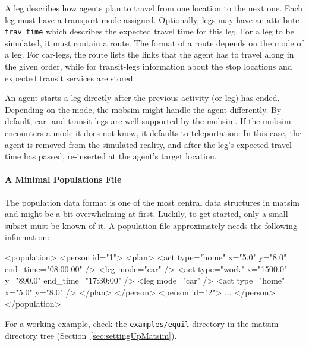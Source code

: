 A \gls{leg} describes how agents plan to travel from one location to the next one. Each \gls{leg} must have a transport mode assigned. Optionally, legs may have an attribute \lstinline|trav_time| which describes the expected travel time for this leg. For a leg to be simulated, it must contain a route. The format of a route depends on the mode of a leg. For car-legs, the route lists the links that the agent has to travel along in the given order, while for transit-legs information about the stop locations and expected transit services are stored.

An agent starts a leg directly after the previous activity (or leg) has ended. Depending on the mode, the \gls{mobsim} might handle the agent differently. By default, car- and transit-legs are well-supported by the \gls{mobsim}. If the \gls{mobsim} encounters a mode it does not know, it defaults to \gls{teleportation}: In this case, the agent is removed from the simulated reality, and after the leg's expected travel time has passed, re-inserted at the agent's target location.

\paragraph{A Minimal Populations File}

The population data format is one of the most central data structures in \gls{matsim} and might be a bit overwhelming at first. Luckily, to get started, only a small subset must be known of it.  A population file approximately needs the following information:
\begin{xml}
<population> 
   <person id="1"> 
      <plan> 
         <act type="home" x="5.0" y="8.0" end_time="08:00:00" /> 
         <leg mode="car" /> 
         <act type="work" x="1500.0" y="890.0" end_time="17:30:00" /> 
         <leg mode="car" /> 
         <act type="home" x="5.0" y="8.0" /> 
      </plan> 
   </person> 
   <person id="2"> 
      ... 
   </person> 
</population>
\end{xml}
For a working example, check the \lstinline{examples/equil} directory in the \gls{matsim} directory tree (\cf Section~\ref{sec:settingUpMatsim}).

